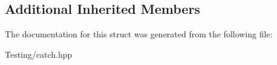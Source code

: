 \subsection*{Additional Inherited Members}


The documentation for this struct was generated from the following file\-:\begin{DoxyCompactItemize}
\item 
Testing/catch.\-hpp\end{DoxyCompactItemize}
